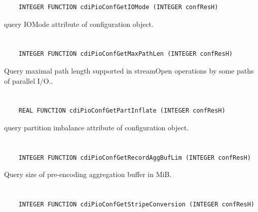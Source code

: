 \begin{verbatim}
    INTEGER FUNCTION cdiPioConfGetIOMode (INTEGER confResH)
\end{verbatim}

query IOMode attribute of configuration object.


\section*{\tt {}}

\begin{verbatim}
    INTEGER FUNCTION cdiPioConfGetMaxPathLen (INTEGER confResH)
\end{verbatim}

Query maximal path length supported in
streamOpen operations by some paths of parallel I/O..


\section*{\tt {}}

\begin{verbatim}
    REAL FUNCTION cdiPioConfGetPartInflate (INTEGER confResH)
\end{verbatim}

query partition imbalance attribute of
configuration object.


\section*{\tt {}}

\begin{verbatim}
    INTEGER FUNCTION cdiPioConfGetRecordAggBufLim (INTEGER confResH)
\end{verbatim}

Query size of pre-encoding
aggregation buffer in MiB.


\section*{\tt {}}

\begin{verbatim}
    INTEGER FUNCTION cdiPioConfGetStripeConversion (INTEGER confResH)
\end{verbatim}

